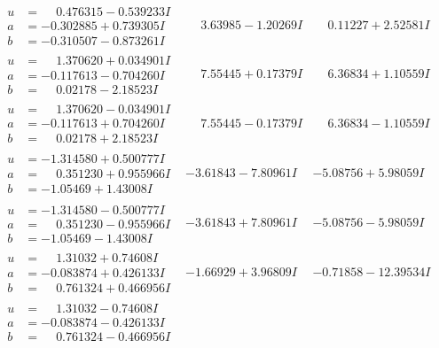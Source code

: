 \documentclass[1p]{elsarticle_modified}
\theoremstyle{definition}
\begin{document}
$$\begin{array}{c|c|c}
\begin{aligned}
u &= \phantom{-}0.476315 - 0.539233 I \\
a &= -0.302885 + 0.739305 I \\
b &= -0.310507 - 0.873261 I\end{aligned}
 & \phantom{-}3.63985 - 1.20269 I & \phantom{-}0.11227 + 2.52581 I \\ \hline\begin{aligned}
u &= \phantom{-}1.370620 + 0.034901 I \\
a &= -0.117613 - 0.704260 I \\
b &= \phantom{-}0.02178 - 2.18523 I\end{aligned}
 & \phantom{-}7.55445 + 0.17379 I & \phantom{-}6.36834 + 1.10559 I \\ \hline\begin{aligned}
u &= \phantom{-}1.370620 - 0.034901 I \\
a &= -0.117613 + 0.704260 I \\
b &= \phantom{-}0.02178 + 2.18523 I\end{aligned}
 & \phantom{-}7.55445 - 0.17379 I & \phantom{-}6.36834 - 1.10559 I \\ \hline\begin{aligned}
u &= -1.314580 + 0.500777 I \\
a &= \phantom{-}0.351230 + 0.955966 I \\
b &= -1.05469 + 1.43008 I\end{aligned}
 & -3.61843 - 7.80961 I & -5.08756 + 5.98059 I \\ \hline\begin{aligned}
u &= -1.314580 - 0.500777 I \\
a &= \phantom{-}0.351230 - 0.955966 I \\
b &= -1.05469 - 1.43008 I\end{aligned}
 & -3.61843 + 7.80961 I & -5.08756 - 5.98059 I \\ \hline\begin{aligned}
u &= \phantom{-}1.31032 + 0.74608 I \\
a &= -0.083874 + 0.426133 I \\
b &= \phantom{-}0.761324 + 0.466956 I\end{aligned}
 & -1.66929 + 3.96809 I & -0.71858 - 12.39534 I \\ \hline\begin{aligned}
u &= \phantom{-}1.31032 - 0.74608 I \\
a &= -0.083874 - 0.426133 I \\
b &= \phantom{-}0.761324 - 0.466956 I\end{aligned}

\end{array}$$
\end{document}
